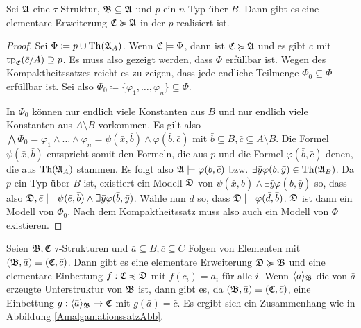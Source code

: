 \begin{lemma}
	Sei $\mathfrak{A}$ eine $\tau$-Struktur, $\mathfrak{B}\subseteq\mathfrak{A}$ und $p$ ein $n$-Typ über $B$. Dann gibt es eine elementare Erweiterung $\mathfrak{C}\succcurlyeq\mathfrak{A}$ in der $p$ realisiert ist.
\end{lemma}
\begin{proof}
	Sei $\Phi\coloneqq p \cup \operatorname{Th}(\mathfrak{A}_A)$. Wenn $\mathfrak{C}\models\Phi$, dann ist $\mathfrak{C}\succcurlyeq\mathfrak{A}$ und es gibt $\bar{c}$ mit $\operatorname{tp}_{\mathfrak{C}}(\bar{c}/A)\supseteq p$. Es muss also gezeigt werden, dass $\Phi$ erfüllbar ist. Wegen des Kompaktheitssatzes reicht es zu zeigen, dass jede endliche Teilmenge $\Phi_0\subseteq \Phi$ erfüllbar ist. Sei also $\Phi_0\coloneqq\{\varphi_1,\dots,\varphi_n\}\subseteq\Phi$.
	
	In $\Phi_0$ können nur endlich viele Konstanten aus $B$ und nur endlich viele Konstanten aus $A\setminus B$ vorkommen. Es gilt also $\bigwedge\Phi_0=\varphi_1\land\dots\land\varphi_n=\psi(\bar{x},\bar{b})\land\varphi(\bar{b},\bar{c})$ mit $\bar{b}\subseteq B,\bar{c}\subseteq A\setminus B$. 
	Die Formel $\psi(\bar{x},\bar{b})$ entspricht somit den Formeln, die aus $p$ und die Formel $\varphi(\bar{b},\bar{c})$ denen, die aus $\operatorname{Th}(\mathfrak{A}_A)$ stammen. Es folgt also $\mathfrak{A}\models\varphi(\bar{b},\bar{c})$ bzw. $\exists\bar{y}\varphi(\bar{b},\bar{y})\in \operatorname{Th}(\mathfrak{A}_B)$. 
	Da $p$ ein Typ über $B$ ist, existiert ein Modell $\mathfrak{D}$ von $\psi(\bar{x},\bar{b})\land\exists\bar{y}\varphi(\bar{b},\bar{y})$ so, dass also $\mathfrak{D},\bar{e}\models \psi(\bar{e},\bar{b})\land\exists\bar{y}\varphi(\bar{b},\bar{y})$.
	Wähle nun $\bar{d}$ so, dass $\mathfrak{D}\models\varphi(\bar{d},\bar{b})$. $\mathfrak{D}$ ist dann ein Modell von $\Phi_0$. Nach dem Kompaktheitssatz muss also auch ein Modell von $\Phi$ existieren.
\end{proof}

\begin{satz}[Amalgamationssatz]
	Seien $\mathfrak{B},\mathfrak{C}$ $\tau$-Strukturen und $\bar{a}\subseteq B,\bar{c}\subseteq C$ Folgen von Elementen mit $(\mathfrak{B},\bar{a})\equiv(\mathfrak{C},\bar{c})$. Dann gibt es eine elementare Erweiterung $\mathfrak{D}\succcurlyeq\mathfrak{B}$ und eine elementare Einbettung $f:\mathfrak{C}\preccurlyeq\mathfrak{D}$ mit $f(c_i)=a_i$ für alle $i$. 
	Wenn $\langle\bar{a}\rangle_{\mathfrak{B}}$ die von $\bar{a}$ erzeugte Unterstruktur von $\mathfrak{B}$ ist, dann gibt es, da $(\mathfrak{B},\bar{a})\equiv(\mathfrak{C},\bar{c})$, eine Einbettung $g:\langle\bar{a}\rangle_{\mathfrak{B}}\to\mathfrak{C}$ mit $g(\bar{a})=\bar{c}$. Es ergibt sich ein Zusammenhang wie in Abbildung \ref{AmalgamationssatzAbb}.
	\label{Amalgamationssatz}
\end{satz}

